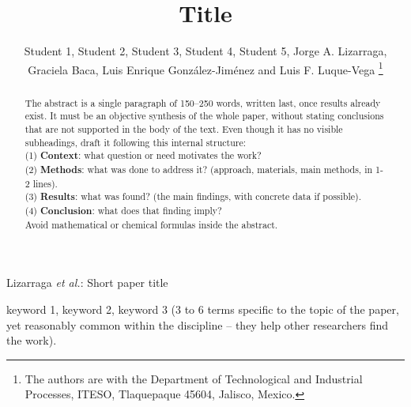 \documentclass[lettersize,journal]{IEEEtran}
\begin{document}
\title{Title}

\author{Student 1, Student 2, Student 3, Student 4, Student 5, Jorge A. Lizarraga, Graciela Baca, Luis Enrique González-Jiménez and Luis F. Luque-Vega
\thanks{The authors are with the Department of Technological and
Industrial Processes, ITESO, Tlaquepaque 45604, Jalisco, Mexico.}}

%
{Lizarraga \MakeLowercase{\textit{et al.}}: Short paper title}

\maketitle

\begin{abstract}
The abstract is a single paragraph of 150--250 words, written last,
once results already exist. It must be an objective synthesis of the
whole paper, without stating conclusions that are not supported in the
body of the text. Even though it has no visible subheadings, draft it
following this internal structure: \\
(1) \textbf{Context}: what question or need motivates the work? \\
(2) \textbf{Methods}: what was done to address it? (approach,
materials, main methods, in 1-2 lines). \\
(3) \textbf{Results}: what was found? (the main findings, with
concrete data if possible). \\
(4) \textbf{Conclusion}: what does that finding imply? \\
Avoid mathematical or chemical formulas inside the abstract.
\end{abstract}

\begin{IEEEkeywords}
keyword 1, keyword 2, keyword 3 (3 to 6 terms specific to the
topic of the paper, yet reasonably common within the discipline --
they help other researchers find the work).
\end{IEEEkeywords}

\setcounter{section}{-1} %
\end{document}
